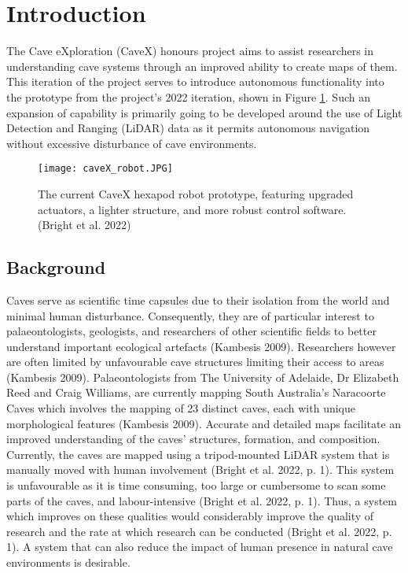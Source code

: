 \section{Introduction}
The Cave eXploration (CaveX) honours project aims to assist researchers in understanding cave systems through an improved ability to create maps of them. This iteration of the project serves to introduce autonomous functionality into the prototype from the project's 2022 iteration, shown in Figure \ref{fig:caveXrobot}. Such an expansion of capability is primarily going to be developed around the use of Light Detection and Ranging (LiDAR) data as it permits autonomous navigation without excessive disturbance of cave environments.

\begin{figure}[H]
    \centering
    \texttt{[image: caveX\_robot.JPG]}
    \caption{The current CaveX hexapod robot prototype, featuring upgraded actuators, a lighter structure, and more robust control software. (Bright et al. 2022)}
    \label{fig:caveXrobot}
\end{figure}

\subsection{Background}
Caves serve as scientific time capsules due to their isolation from the world and minimal human disturbance. Consequently, they are of particular interest to palaeontologists, geologists, and researchers of other scientific fields to better understand important ecological artefacts (Kambesis 2009). Researchers however are often limited by unfavourable cave structures limiting their access to areas (Kambesis 2009). Palaeontologists from The University of Adelaide, Dr Elizabeth Reed and Craig Williams, are currently mapping South Australia’s Naracoorte Caves which involves the mapping of 23 distinct caves, each with unique morphological features (Kambesis 2009). Accurate and detailed maps facilitate an improved understanding of the caves' structures, formation, and composition. Currently, the caves are mapped using a tripod-mounted LiDAR system that is manually moved with human involvement (Bright et al. 2022, p. 1). This system is unfavourable as it is time consuming, too large or cumbersome to scan some parts of the caves, and labour-intensive (Bright et al. 2022, p. 1). Thus, a system which improves on these qualities would considerably improve the quality of research and the rate at which research can be conducted (Bright et al. 2022, p. 1). A system that can also reduce the impact of human presence in natural cave environments is desirable.


